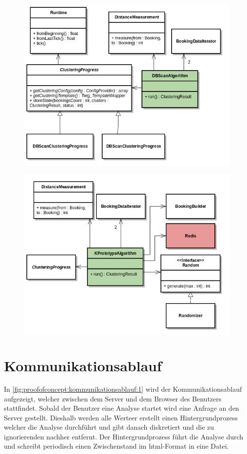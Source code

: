 \begin{figure}[H]
	\centering
	\includegraphics[width=1\textwidth]{images/diagram-class-DBScanAlgorithm}
	\caption{}
	\label{fig:proofofconcept:klassenstruktur:3}
\end{figure}
\begin{figure}[H]
	\centering
	\includegraphics[width=1\textwidth]{images/diagram-class-KPrototypeAlgorithm}
	\caption{}
	\label{fig:proofofconcept:klassenstruktur:4}
\end{figure}

\section{Kommunikationsablauf}
\label{sec:proofofconcept:kommunikationsablauf}
In \cref{fig:proofofconcept:kommunikationsablauf:1} wird der Kommunikationsablauf aufgezeigt, welcher zwischen dem Server und dem Browser des Benutzers stattfindet. Sobald der Benutzer eine Analyse startet wird eine Anfrage an den Server gestellt. Dieshalb werden alle Werteer erstellt einen Hintergrundprozess welcher die Analyse durchführt und gibt danach diskretiert und die zu ignorierenden nachher entfernt.
Der Hintergrundprozess führt die Analyse durch und schreibt periodisch einen Zwischenstand im \gls{html}-Format in eine Datei.

